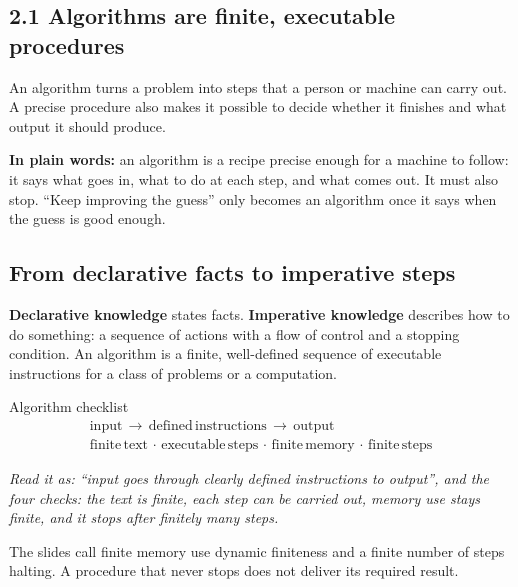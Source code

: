 \documentclass[11pt]{article}
\begin{document}
\begin{keepsection}
\section{2.1 Algorithms are finite, executable procedures}

An algorithm turns a problem into steps that a person or machine can carry out. A precise procedure also makes it possible to decide whether it finishes and what output it should produce.

\begin{plainbox}\textbf{In plain words:} an algorithm is a recipe precise enough for a machine to follow: it says what goes in, what to do at each step, and what comes out. It must also stop. “Keep improving the guess” only becomes an algorithm once it says when the guess is good enough.\end{plainbox}

\begin{keepsection}
\subsection{From declarative facts to imperative steps}

\textbf{Declarative knowledge} states facts. \textbf{Imperative knowledge} describes how to do something: a sequence of actions with a flow of control and a stopping condition. An algorithm is a finite, well-defined sequence of executable instructions for a class of problems or a computation.

\begin{equationcard}{Algorithm checklist}
\[ \begin{gathered} \text{input}\, \to \, \text{defined}\, \text{instructions}\, \to \, \text{output} \\ \text{finite}\, \text{text}\, \cdot \, \text{executable}\, \text{steps}\, \cdot \, \text{finite}\, \text{memory}\, \cdot \, \text{finite}\, \text{steps} \end{gathered} \]
{\small \emph{Read it as: “input goes through clearly defined instructions to output”, and the four checks: the text is finite, each step can be carried out, memory use stays finite, and it stops after finitely many steps.}\par The slides call finite memory use dynamic finiteness and a finite number of steps halting. A procedure that never stops does not deliver its required result.}
\end{equationcard}


\end{keepsection}
\end{keepsection}
\end{document}
